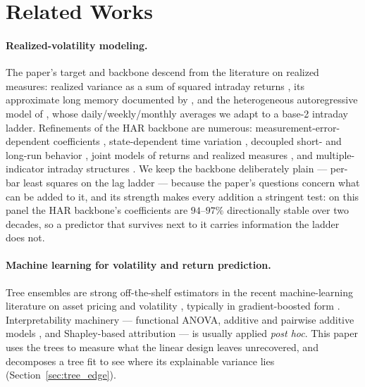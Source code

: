 \section{Related Works}
\label{sec:related}


\paragraph{Realized-volatility modeling.}
The paper's target and backbone descend from the literature on realized
measures: realized variance as a sum of squared intraday returns
\citep{AndersenBollerslev1997,BarndorffNielsenShephard2004}, its
approximate long memory documented by
\citet{AndersenBollerslevDieboldLabys2003}, and the heterogeneous
autoregressive model of \citet{Corsi2009}, whose daily/weekly/monthly
averages we adapt to a base-2 intraday ladder. Refinements of the HAR
backbone are numerous: measurement-error-dependent coefficients
\citep{BollerslevPattonQuaedvlieg2016}, state-dependent time variation
\citep{BekiermanManner2018}, decoupled short- and long-run behavior
\citep{BennedsenLundePakkanen2022}, joint models of returns and realized
measures \citep{HansenHuangShek2012}, and multiple-indicator intraday
structures \citep{EngleGallo2006}. We keep the backbone deliberately
plain --- per-bar least squares on the lag ladder --- because the paper's
questions concern what can be added to it, and its strength makes every
addition a stringent test: on this panel the HAR backbone's coefficients are
$94$--$97\%$ directionally stable over two decades, so a predictor that
survives next to it carries information the ladder does not.

\paragraph{Machine learning for volatility and return prediction.}
Tree ensembles are strong off-the-shelf estimators in the recent
machine-learning literature on asset pricing and volatility
\citep{gu2020empirical,christensen2023machine}, typically in
gradient-boosted form \citep{Ke2017,Chen2016}. Interpretability
machinery --- functional ANOVA, additive and pairwise additive models
\citep{Lou2013}, and Shapley-based attribution
\citep{lundberg2017unified,lundberg2018consistent} --- is usually
applied \emph{post hoc}. This paper uses the trees to measure what the
linear design leaves unrecovered, and decomposes a tree fit to see where
its explainable variance lies (Section~\ref{sec:tree_edge}).

